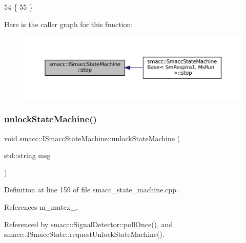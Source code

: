 \begin{DoxyCode}
54 \{
55 \}
\end{DoxyCode}
Here is the caller graph for this function\+:
\nopagebreak
\begin{figure}[H]
\begin{center}
\leavevmode
\includegraphics[width=350pt]{classsmacc_1_1ISmaccStateMachine_adcb1b55e014f982a713a863ffb0261d3_icgraph}
\end{center}
\end{figure}
\mbox{\label{classsmacc_1_1ISmaccStateMachine_ae2e3ceb87bfe3f9d8bf320e36071fdc7}} 
\subsubsection{\texorpdfstring{unlock\+State\+Machine()}{unlockStateMachine()}}
{\footnotesize\ttfamily void smacc\+::\+I\+Smacc\+State\+Machine\+::unlock\+State\+Machine (\begin{DoxyParamCaption}\item[{std\+::string}]{msg }\end{DoxyParamCaption})\hspace{0.3cm}{\ttfamily [private]}}



Definition at line 159 of file smacc\+\_\+state\+\_\+machine.\+cpp.



References m\+\_\+mutex\+\_\+.



Referenced by smacc\+::\+Signal\+Detector\+::poll\+Once(), and smacc\+::\+I\+Smacc\+State\+::request\+Unlock\+State\+Machine().


